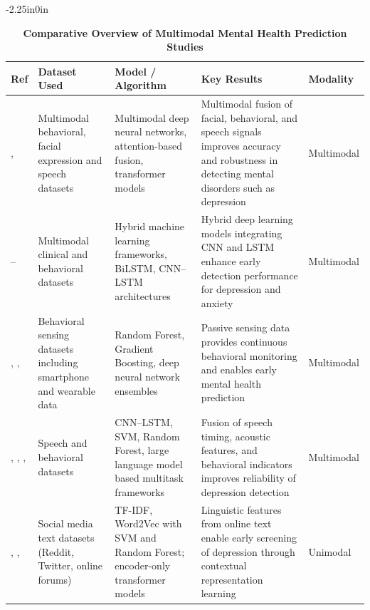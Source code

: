 \documentclass[10pt,letterpaper]{article}
\begin{document}
        \begin{table}[!t]
        \begin{adjustwidth}{-2.25in}{0in}
        \centering
        \caption{\textbf{Comparative Overview of Multimodal Mental Health Prediction Studies}}
        \label{tab:multimodal_comparison}
        \footnotesize
        \renewcommand{\arraystretch}{1.15}

        \begin{tabular}{|p{2.0cm}|p{3.5cm}|p{3.8cm}|p{4.8cm}|p{1.8cm}|}
        \hline
        \textbf{Ref} & \textbf{Dataset Used} & \textbf{Model / Algorithm} & \textbf{Key Results} & \textbf{Modality} \\
        \hline

        \cite{ref1},\cite{ref4}
        & Multimodal behavioral, facial expression and speech datasets
        & Multimodal deep neural networks, attention-based fusion, transformer models
        & Multimodal fusion of facial, behavioral, and speech signals improves accuracy and robustness in detecting mental disorders such as depression
        & Multimodal \\
        \hline

        \cite{ref5}--\cite{ref8}
        & Multimodal clinical and behavioral datasets
        & Hybrid machine learning frameworks, BiLSTM, CNN--LSTM architectures
        & Hybrid deep learning models integrating CNN and LSTM enhance early detection performance for depression and anxiety
        & Multimodal \\
        \hline

        \cite{ref9}, \cite{ref12}, \cite{ref26}
        & Behavioral sensing datasets including smartphone and wearable data
        & Random Forest, Gradient Boosting, deep neural network ensembles
        & Passive sensing data provides continuous behavioral monitoring and enables early mental health prediction
        & Multimodal \\
        \hline

        \cite{ref10}, \cite{ref14}, \cite{ref20}, \cite{ref27}
        & Speech and behavioral datasets
        & CNN--LSTM, SVM, Random Forest, large language model based multitask frameworks
        & Fusion of speech timing, acoustic features, and behavioral indicators improves reliability of depression detection
        & Multimodal \\
        \hline

        \cite{ref11}, \cite{ref13}, \cite{ref17}
        & Social media text datasets (Reddit, Twitter, online forums)
        & TF-IDF, Word2Vec with SVM and Random Forest; encoder-only transformer models
        & Linguistic features from online text enable early screening of depression through contextual representation learning
        & Unimodal \\
        \hline


\end{tabular}
\end{adjustwidth}
\end{table}
\end{document}
